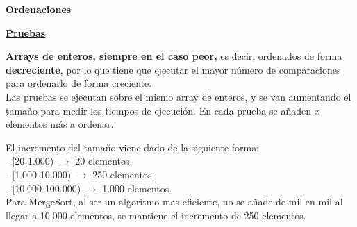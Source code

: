 

\begin{flushleft}
\textbf{Ordenaciones}
\begin{mdframed}[roundcorner=5pt]
\textbf{\underline{Pruebas}}
\vspace{0.1cm}

\scriptsize	
\textbf{Arrays de enteros, siempre en el caso peor,} es decir, ordenados de forma \textbf{decreciente}, por lo que tiene que ejecutar el mayor número de comparaciones para ordenarlo de forma creciente.\\	
Las pruebas se ejecutan sobre el mismo array de enteros, y se van aumentando el tamaño para medir los tiempos de ejecución. En cada prueba se añaden \textit{x} elementos más a ordenar.
\begin{tcolorbox}[boxrule=0.5pt, fontupper=\small]
	\scriptsize
	El incremento del tamaño viene dado de la siguiente forma:\\
	- [20-1.000) $\rightarrow$ 20 elementos.\\
	- [1.000-10.000) $\rightarrow$ 250 elementos.\\
	- [10.000-100.000) $\rightarrow$ 1.000 elementos.\\
	Para MergeSort, al ser un algoritmo mas eficiente, no se añade de mil en mil al llegar a 10.000 elementos, se mantiene el incremento de 250 elementos.

\end{tcolorbox}

\end{mdframed}
\end{flushleft}

\newpage

